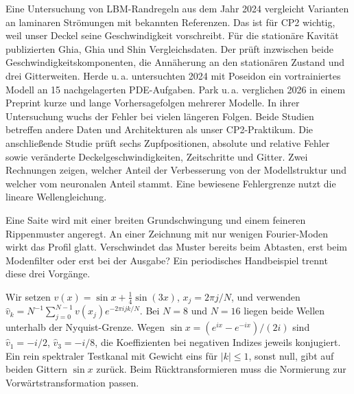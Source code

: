 Eine Untersuchung von LBM-Randregeln aus dem Jahr 2024 vergleicht Varianten an laminaren Strömungen mit bekannten Referenzen. Das ist für CP2 wichtig, weil unser Deckel seine Geschwindigkeit vorschreibt. Für die stationäre Kavität publizierten Ghia, Ghia und Shin Vergleichsdaten. Der  prüft inzwischen beide Geschwindigkeitskomponenten, die Annäherung an den stationären Zustand und drei Gitterweiten.
Herde u.\,a. untersuchten 2024 mit Poseidon ein vortrainiertes Modell an 15 nachgelagerten PDE-Aufgaben. Park u.\,a. verglichen 2026 in einem Preprint kurze und lange Vorhersagefolgen mehrerer Modelle. In ihrer Untersuchung wuchs der Fehler bei vielen längeren Folgen. Beide Studien betreffen andere Daten und Architekturen als unser CP2-Praktikum.
Die anschließende Studie prüft sechs Zupfpositionen, absolute und relative Fehler sowie veränderte Deckelgeschwindigkeiten, Zeitschritte und Gitter. Zwei Rechnungen zeigen, welcher Anteil der Verbesserung von der Modellstruktur und welcher vom neuronalen Anteil stammt. Eine bewiesene Fehlergrenze nutzt die lineare Wellengleichung.

Eine Saite wird mit einer breiten Grundschwingung und einem feineren Rippenmuster angeregt. An einer Zeichnung mit nur wenigen Fourier-Moden wirkt das Profil glatt. Verschwindet das Muster bereits beim Abtasten, erst beim Modenfilter oder erst bei der Ausgabe? Ein periodisches Handbeispiel trennt diese drei Vorgänge.

Wir setzen \(v(x)=\sin x+\tfrac14\sin(3x)\), \(x_j=2\pi j/N\), und verwenden \(\hat v_k=N^{-1}\sum_{j=0}^{N-1}v(x_j)e^{-2\pi ijk/N}\). Bei \(N=8\) und \(N=16\) liegen beide Wellen unterhalb der Nyquist-Grenze. Wegen \(\sin x=(e^{ix}-e^{-ix})/(2i)\) sind \(\hat v_1=-i/2\), \(\hat v_3=-i/8\), die Koeffizienten bei negativen Indizes jeweils konjugiert. Ein rein spektraler Testkanal mit Gewicht eins für \(|k|\le1\), sonst null, gibt auf beiden Gittern \(\sin x\) zurück. Beim Rücktransformieren muss die Normierung zur Vorwärtstransformation passen.

